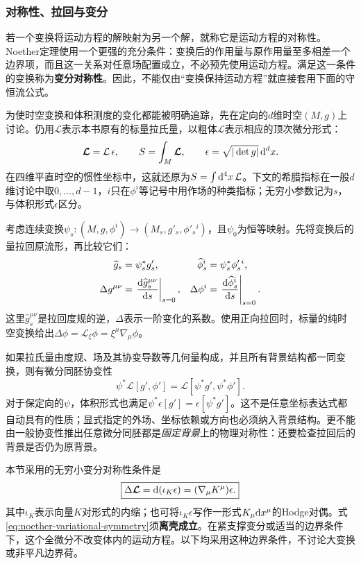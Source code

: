\subsubsection{对称性、拉回与变分}
若一个变换将运动方程的解映射为另一个解，就称它是运动方程的对称性。Noether定理使用一个更强的充分条件：变换后的作用量与原作用量至多相差一个边界项，而且这一关系对任意场配置成立，不必预先使用运动方程。满足这一条件的变换称为\textbf{变分对称性}。因此，不能仅由“变换保持运动方程”就直接套用下面的守恒流公式。

为使时空变换和体积测度的变化都能被明确追踪，先在定向的$d$维时空$(M,g)$上讨论。仍用$\mathcal L$表示本书原有的标量拉氏量，以粗体$\boldsymbol{\mathcal L}$表示相应的顶次微分形式：
\begin{equation}
    \boldsymbol{\mathcal L}=\mathcal L\,\epsilon,
    \qquad S=\int_M\boldsymbol{\mathcal L},
    \qquad \epsilon=\sqrt{|\det g|}\,\mathrm d^dx.
\end{equation}
在四维平直时空的惯性坐标中，这就还原为$S=\int\mathrm d^4x\,\mathcal L$。下文的希腊指标在一般$d$维讨论中取$0,\ldots,d-1$，$i$只在$\phi^i$等记号中用作场的种类指标；无穷小参数记为$s$，与体积形式$\epsilon$区分。

考虑连续变换$\psi_s:(M,g,\phi^i)\to(M_s,g'_s,\phi'_s{}^i)$，且$\psi_0$为恒等映射。先将变换后的量拉回原流形，再比较它们：
\begin{align}
    \widehat g_s&=\psi_s^*g'_s,
    &\widehat\phi_s^i&=\psi_s^*\phi'_s{}^i,\\
    \Delta g^{\mu\nu}&=\left.\frac{\mathrm d\widehat g_s^{\mu\nu}}{\mathrm d s}\right|_{s=0},
    &\Delta\phi^i&=\left.\frac{\mathrm d\widehat\phi_s^i}{\mathrm d s}\right|_{s=0}.
\end{align}
这里$\widehat g_s^{\mu\nu}$是拉回度规的逆，$\Delta$表示一阶变化的系数。使用正向拉回时，标量的纯时空变换给出$\Delta\phi=\mathscr L_\xi\phi=\xi^\mu\nabla_\mu\phi$。

如果拉氏量由度规、场及其协变导数等几何量构成，并且所有背景结构都一同变换，则有微分同胚协变性
\begin{equation}
    \psi^*\boldsymbol{\mathcal L}[g',\phi']
    =\boldsymbol{\mathcal L}[\psi^*g',\psi^*\phi'].
\end{equation}
对于保定向的$\psi$，体积形式也满足$\psi^*\epsilon[g']=\epsilon[\psi^*g']$。这不是任意坐标表达式都自动具有的性质；显式指定的外场、坐标依赖或方向也必须纳入背景结构。更不能由一般协变性推出任意微分同胚都是\emph{固定背景}上的物理对称性：还要检查拉回后的背景是否仍为原背景。

本节采用的无穷小变分对称性条件是
\begin{equation}
    \boxed{\Delta\boldsymbol{\mathcal L}
    =\mathrm d(\iota_K\epsilon)
    =(\nabla_\mu K^\mu)\epsilon.}
    \label{eq:noether-variational-symmetry}
\end{equation}
其中$\iota_K$表示向量$K$对形式的内缩；也可将$\iota_K\epsilon$写作一形式$K_\mu\mathrm d x^\mu$的Hodge对偶。式\eqref{eq:noether-variational-symmetry}须\textbf{离壳成立}。在紧支撑变分或适当的边界条件下，这个全微分不改变体内的运动方程。以下均采用这种边界条件，不讨论大变换或非平凡边界荷。

